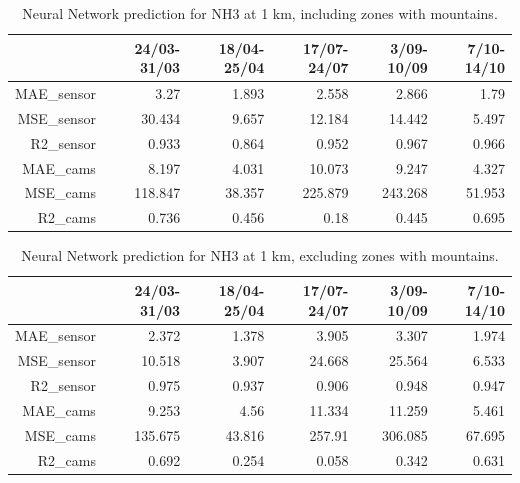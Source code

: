 \begin{table}[H]
\begin{tabular}{rrrrrr}
\hline
    &   24/03-31/03 &   18/04-25/04 &   17/07-24/07 &   3/09-10/09 &   7/10-14/10 \\
\hline
  MAE\_sensor   &            3.27  &            1.893 &            2.558 &            2.866 &            1.79  \\
  MSE\_sensor   &           30.434 &            9.657 &           12.184 &           14.442 &            5.497 \\
  R2\_sensor    &            0.933 &            0.864 &            0.952 &            0.967 &            0.966 \\
  MAE\_cams     &            8.197 &            4.031 &           10.073 &            9.247 &            4.327 \\
  MSE\_cams     &          118.847 &           38.357 &          225.879 &          243.268 &           51.953 \\
  R2\_cams      &            0.736 &            0.456 &            0.18  &            0.445 &            0.695 \\
\hline
\end{tabular}
\caption{Neural Network prediction for NH3 at 1 km, including zones with mountains.}
\end{table}


\begin{table}[H]
\begin{tabular}{rrrrrr}
\hline
    &   24/03-31/03 &   18/04-25/04 &   17/07-24/07 &   3/09-10/09 &   7/10-14/10 \\
\hline
  MAE\_sensor   &            2.372 &            1.378 &            3.905 &            3.307 &            1.974 \\
  MSE\_sensor   &           10.518 &            3.907 &           24.668 &           25.564 &            6.533 \\
  R2\_sensor    &            0.975 &            0.937 &            0.906 &            0.948 &            0.947 \\
  MAE\_cams     &            9.253 &            4.56  &           11.334 &           11.259 &            5.461 \\
  MSE\_cams     &          135.675 &           43.816 &          257.91  &          306.085 &           67.695 \\
  R2\_cams      &            0.692 &            0.254 &            0.058 &            0.342 &            0.631 \\
\hline
\end{tabular}
\caption{Neural Network prediction for NH3 at 1 km, excluding zones with mountains.}
\end{table}









